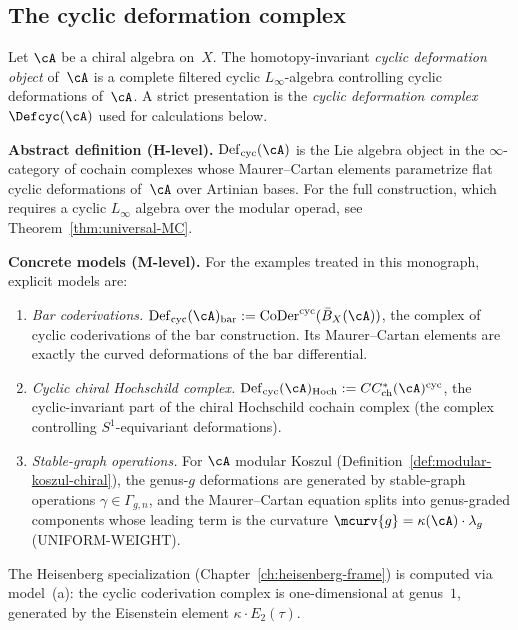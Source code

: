\subsection{The cyclic deformation complex}
\label{subsec:cyclic-deformation}

\begin{definition}
\label{def:cyclic-deformation-elementary}
Let $\cA$ be a chiral algebra on~$X$. The homotopy-invariant
\emph{cyclic deformation object} of~$\cA$ is a complete filtered cyclic
$L_\infty$-algebra controlling cyclic deformations of~$\cA$.
A strict presentation is the
\emph{cyclic deformation complex} $\Defcyc(\cA)$
used for calculations below.

\smallskip\noindent
\textbf{Abstract definition (H-level).}
$\operatorname{Def}_{\mathrm{cyc}}(\cA)$ is the Lie algebra object in
the $\infty$-category of cochain complexes whose Maurer--Cartan
elements parametrize flat cyclic deformations of~$\cA$ over
Artinian bases. For the full construction, which requires a cyclic
$L_\infty$ algebra over the modular operad, see
Theorem~\ref{thm:universal-MC}.

\smallskip\noindent
\textbf{Concrete models (M-level).}
For the examples treated in this monograph, explicit models are:

\begin{enumerate}[label=\textup{(\alph*)}]
\item \emph{Bar coderivations.}
 $\operatorname{Def}_{\mathrm{cyc}}(\cA)_{\mathrm{bar}}
 := \operatorname{CoDer}^{\mathrm{cyc}}(\bar{B}_X(\cA))$,
 the complex of cyclic coderivations of the bar construction.
 Its Maurer--Cartan elements are exactly the curved deformations
 of the bar differential.
\item \emph{Cyclic chiral Hochschild complex.}
 $\operatorname{Def}_{\mathrm{cyc}}(\cA)_{\mathrm{Hoch}}
 := CC^*_{\mathrm{ch}}(\cA)^{\mathrm{cyc}}$,
 the cyclic-invariant part of the chiral Hochschild cochain complex
 (the complex controlling $S^1$-equivariant deformations).
\item \emph{Stable-graph operations.}
 For $\cA$ modular Koszul
 (Definition~\ref{def:modular-koszul-chiral}), the genus-$g$
 deformations are generated by stable-graph operations
 $\gamma \in \Gamma_{g,n}$, and the Maurer--Cartan equation
 splits into genus-graded components whose leading term is the
 curvature $\mcurv{g} = \kappa(\cA) \cdot \lambda_g$
 \textup{(UNIFORM-WEIGHT)}.
\end{enumerate}

The Heisenberg specialization (Chapter~\ref{ch:heisenberg-frame})
is computed via model~(a): the cyclic coderivation complex is
one-dimensional at genus~$1$, generated by the Eisenstein element
$\kappa \cdot E_2(\tau)$.
\end{definition}


